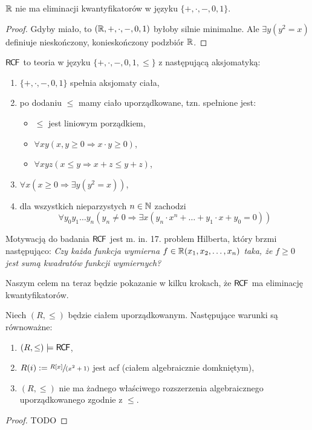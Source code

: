 \documentclass{article}
\begin{document}
\begin{stw}
	 $ \mathbb{R} $ nie ma eliminacji kwantyfikatorów w języku $ \{+, \cdot, -, 0, 1\} $. %
\end{stw}
\begin{proof}
	Gdyby miało, to $ (\mathbb{R}, +, \cdot, -, 0, 1) $ byłoby silnie minimalne.
	Ale $\exists y (y^2 = x) $ definiuje nieskończony, konieskończony podzbiór $ \mathbb{R} $.
\end{proof}

\begin{df}
	 $ \mathsf{R \mkern-1.7mu C \mkern-1.4mu F} $ to teoria w języku $ \{ +, \cdot, -, 0, 1, \leq \} $ z następującą aksjomatyką:
	 \begin{enumerate}
		 \item $ \{+, \cdot, -, 0, 1\} $ spełnia aksjomaty ciała,
		 \item po dodaniu $\leq $ mamy ciało uporządkowane, tzn. spełnione jest:
			 \begin{itemize}
				 \item $ \leq $ jest liniowym porządkiem,
				 \item $ \forall x y (x, y \geq 0 \Rightarrow x\cdot y \geq 0) $,
				 \item $\forall x y z (x \leq y \Rightarrow x + z \leq y + z )  $,
			 \end{itemize}

		 \item $ \forall x (x \geq 0 \Rightarrow \exists y ( y^2 = x )) $,
		 \item dla wszystkich nieparzystych $ n \in \mathbb{N}$ zachodzi
			 \[
				 \forall y_0 y_1 \ldots y_n (y_n \neq 0 \Rightarrow \exists x (y_n \cdot x^n + \ldots + y_1 \cdot x + y_0 = 0))
		         \]
	 \end{enumerate}

\end{df}

Motywacją do badania $ \mathsf{R \mkern-1.7mu C \mkern-1.4mu F} $ jest m. in. 17. problem Hilberta, który brzmi następująco:
\textit{Czy każda funkcja wymierna $ f \in \mathbb{R}(x_1, x_2, \ldots, x_n ) $ taka, że $ f \geq 0 $ jest sumą kwadratów funkcji wymiernych?}

Naszym celem na teraz będzie pokazanie w kilku krokach, że $ \mathsf{R \mkern-1.7mu C \mkern-1.4mu F} $ ma eliminację kwantyfikatorów.

\begin{tw}
\label{tw:rcf}
	 Niech $ (R, \leq) $ będzie ciałem uporządkowanym.
	 Następujące warunki są równoważne:
	 \begin{enumerate}
		 \item $(R, \leq) \models \mathsf{R \mkern-1.7mu C \mkern-1.4mu F} $,
		 \item $R(i) := \sfrac{R[x]}{(x^2 + 1)} $ jest acf (ciałem algebraicznie domkniętym),
		 \item $ (R, \leq) $ nie ma żadnego właściwego rozszerzenia algebraicznego uporządkowanego zgodnie z $ \leq $.
	 \end{enumerate}

\end{tw}
\begin{proof}
	 TODO
\end{proof}
\end{document}
